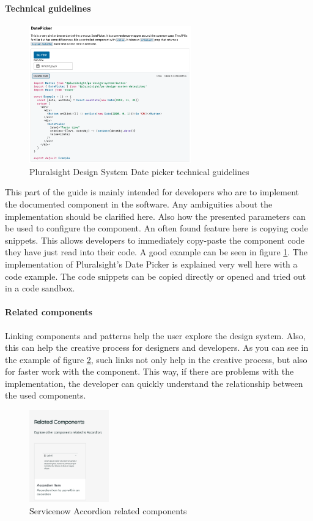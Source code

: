 \paragraph*{Technical guidelines} \label{tech_guideline}
\begin{figure}
	\includegraphics[width=7cm]{images/pluralsight_date-picker_technical.png}
	\caption{Pluralsight Design System Date picker technical guidelines \cite{pluralsight_ds_nodate}}
	\label{pluralsight_date_picker}
	\end{figure}
This part of the guide is mainly intended for developers who are to implement the documented component in the software. Any ambiguities about the implementation should be clarified here.  \cite{macdonald_practical_2019} Also how the presented parameters can be used to configure the component. An often found feature here is copying code snippets. This allows developers to immediately copy-paste the component code they have just read into their code. \cite{vesselov_building_2019} A good example can be seen in figure \ref{pluralsight_date_picker}. The implementation of Pluralsight's Date Picker is explained very well here with a code example. The code snippets can be copied directly or opened and tried out in a code sandbox.

\paragraph*{Related components} Linking components and patterns help the user explore the design system. Also, this can help the creative process for designers and developers.  \cite{vesselov_building_2019} As you can see in the example of figure \ref{servicenow_accordion}, such links not only help in the creative process, but also for faster work with the component. This way, if there are problems with the implementation, the developer can quickly understand the relationship between the used components.
\begin{figure}[htbp]
\centerline{\includegraphics[height=150px]{images/servicenow_accordion_related.png}}
\caption{Servicenow Accordion related components \cite{servicenow_servicenow_nodate}}
\label{servicenow_accordion}
\end{figure}

